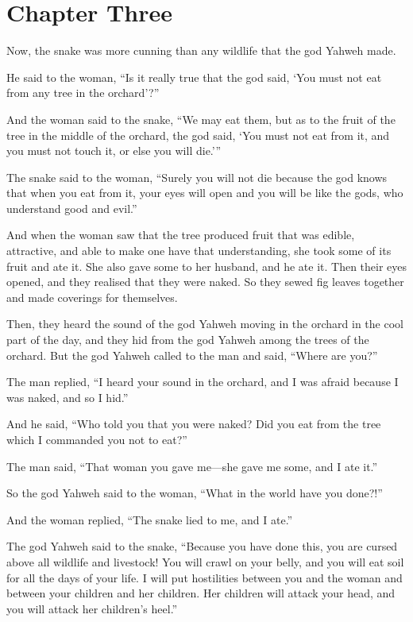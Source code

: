 \chapter*{Chapter Three}

Now, the snake was more cunning than any wildlife that the god Yahweh made. 

He said to the woman, 
\enquote{Is it really true that the god said, 
    \enquote{You must not eat from any tree in the orchard}?}

And the woman said to the snake, 
\enquote{We may eat them, but as to the fruit of the tree in the middle of the orchard, 
the god said, \enquote{You must not eat from it, and you must not touch it, 
or else you will die.}}

The snake said to the woman, 
\enquote{Surely you will not die because the god knows that when you eat from it, 
your eyes will open and you will be like the gods, 
who understand good and evil.}

And when the woman saw that the tree produced fruit that 
was edible, attractive, and able to make one have that understanding, 
she took some of its fruit and ate it. 
She also gave some to her husband, and he ate it. 
Then their eyes opened, and they realised that they were naked. 
So they sewed fig leaves together and made coverings for themselves.

Then, 
they heard the sound of the god Yahweh moving in the orchard 
in the cool part of the day, 
and they hid from the god Yahweh among the trees of the orchard. 
But the god Yahweh called to the man and said, \enquote{Where are you?}

The man replied, 
\enquote{I heard your sound in the orchard, 
and I was afraid because I was naked, 
and so I hid.}

And he said, 
\enquote{Who told you that you were naked? 
Did you eat from the tree which I commanded you not to eat?}

The man said, 
\enquote{That woman you gave me---she gave me some, and I ate it.}

So the god Yahweh said to the woman, \enquote{What in the world have you done?!}

And the woman replied, \enquote{The snake lied to me, and I ate.}

The god Yahweh said to the snake, 
\enquote{Because you have done this, 
you are cursed above all wildlife and livestock!
You will crawl on your belly, 
and you will eat soil 
for all the days of your life. 
I will put hostilities between you and the woman 
and between your children and her children. 
Her children will attack your head, 
and you will attack her children's heel.} 

